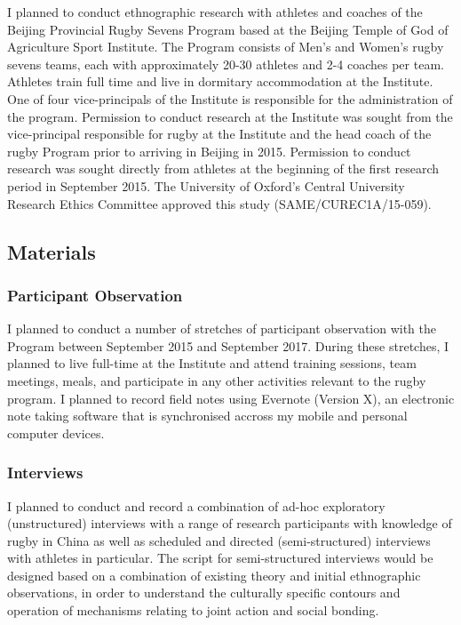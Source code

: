 I planned to conduct ethnographic research with athletes and coaches of the Beijing Provincial Rugby Sevens Program based at the Beijing Temple of God of Agriculture Sport Institute.  The Program consists of Men's and Women's rugby sevens teams, each with approximately 20-30 athletes and 2-4 coaches per team. Athletes train full time and live in dormitary accommodation at the Institute.  One of four vice-principals of the Institute is responsible for the administration of the program.   Permission to conduct research at the Institute was sought from the vice-principal responsible for rugby at the Institute and the head coach of the rugby Program prior to arriving in Beijing in 2015.  Permission to conduct research was sought directly from athletes at the beginning of the first research period in September 2015. The University of Oxford’s Central University Research Ethics Committee approved this study (SAME/CUREC1A/15-059).

\subsection{Materials}

  \subsubsection{Participant Observation}
  I planned to conduct a number of stretches of participant observation with the Program between September 2015 and September 2017.  During these stretches, I planned to live full-time at the Institute and attend training sessions, team meetings, meals, and participate in any other activities relevant to the rugby program.  I planned to record field notes using Evernote (Version X), an electronic note taking software that is synchronised accross my mobile and personal computer devices.

  \subsubsection{Interviews}
  I planned to conduct and record a combination of ad-hoc exploratory (unstructured) interviews with a range of research participants with knowledge of rugby in China as well as scheduled and directed (semi-structured) interviews with athletes in particular.  The script for semi-structured interviews would be designed based on a combination of existing theory and initial ethnographic observations, in order to understand the culturally specific contours and operation of mechanisms relating to joint action and social bonding.


